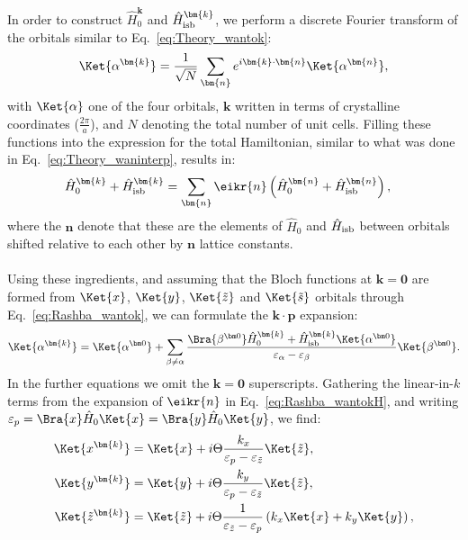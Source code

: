 In order to construct $\hat{H}_0^{\bm{k}}$ and $\hat{H}_{\rm isb}^{\bm{k}}$, we perform a discrete Fourier transform of the orbitals similar to Eq.~\eqref{eq:Theory_wantok}:
\begin{equation}
	\label{eq:Rashba_wantok}
	\Ket{\alpha^{\bm{k}}} = \frac{1}{\sqrt{N}}\sum_{\bm{n}} e^{i \bm{k}\cdot \bm{n}}\Ket{\alpha^{\bm{n}}},
\end{equation}
with $\Ket{\alpha}$ one of the four orbitals, $\bm{k}$ written in terms of crystalline coordinates ($\frac{2\pi}{a}$), and $N$ denoting the total number of unit cells.
Filling these functions into the expression for the total Hamiltonian, similar to what was done in Eq.~\eqref{eq:Theory_waninterp}, results in:
\begin{align}
	\label{eq:Rashba_wantokH}
	\hat{H}_0^{\bm{k}} + \hat{H}_{\rm isb}^{\bm{k}} &= \sum_{\bm{n}} \eikr{n} \left(\hat{H}_0^{\bm{n}} + \hat{H}_{\rm isb}^{\bm{n}}\right),%
\end{align}
where the $\bm n$ denote that these are the elements of $\hat{H}_0$ and $\hat{H}_{\rm isb}$ between orbitals shifted relative to each other by $\bm n$ lattice constants.
\\\\
Using these ingredients, and assuming that the Bloch functions at $\bm k = \bm 0$ are formed from $\Ket{x}$, $\Ket{y}$, $\Ket{\tilde{z}}$ and $\Ket{\tilde{s}}$ orbitals through Eq.~\eqref{eq:Rashba_wantok}, we can formulate the $\bm k \cdot \bm p$ expansion:
\begin{equation}
	\Ket{\alpha^{\bm{k}}}=\Ket{\alpha^{\bm 0}} + \sum_{\beta \neq \alpha} \frac{\Bra{\beta^{\bm 0}} \hat{H}_0^{\bm{k}} + \hat{H}_{\rm isb}^{\bm{k}} \Ket{\alpha^{\bm 0}}}{\varepsilon_{\alpha} - \varepsilon_{\beta}} \Ket{\beta^{\bm 0}}.
\end{equation}
In the further equations we omit the $\bm{k}=\bm 0$ superscripts.
Gathering the linear-in-$k$ terms from the expansion of $\eikr{n}$ in Eq.~\eqref{eq:Rashba_wantokH}, and writing $\varepsilon_p = \Bra{x} \hat{H}_0 \Ket{x} = \Bra{y} \hat{H}_0 \Ket{y}$, we find:
\begin{align}
	\Ket{x^{\bm{k}}} &= \Ket{x} + i \Theta \frac{k_x}{\varepsilon_p - \varepsilon_{\tilde{z}}}\Ket{\tilde{z}}, \\
	\Ket{y^{\bm{k}}} &= \Ket{y} + i \Theta \frac{k_y}{\varepsilon_p - \varepsilon_{\tilde{z}}}\Ket{\tilde{z}},\\
	\Ket{\tilde{z}^{\bm{k}}} &= \Ket{\tilde{z}} + i \Theta \frac{1}{\varepsilon_{\tilde{z}} - \varepsilon_p} \left(k_x\Ket{x} + k_y\Ket{y}\right),
\end{align}
